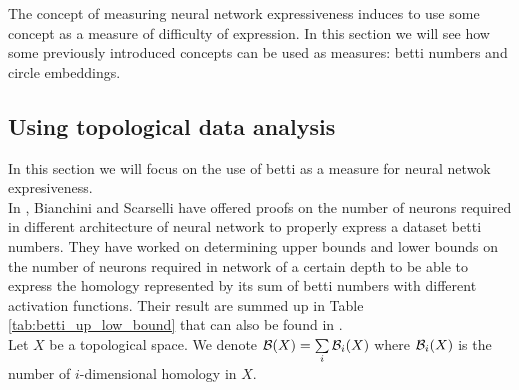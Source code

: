 \documentclass[12pt, a4paper]{article}
\begin{document}
The concept of measuring neural network expressiveness induces to use some concept as a measure of difficulty of expression. In this section we will see how some previously introduced concepts can be used as measures: betti numbers and circle embeddings. 

\subsection{Using topological data analysis}

\label{sec:tda_bib}

In this section we will focus on the use of betti as a measure for neural netwok expresiveness.\\

In \cite{bianchini_complexity_2014}, Bianchini and Scarselli have offered proofs on the number of neurons required in different architecture of neural network to properly express a dataset betti numbers. They have worked on determining upper bounds and lower bounds on the number of neurons required in network of a certain depth to be able to express the homology represented by its sum of betti numbers with different activation functions. Their result are summed up in Table \ref{tab:betti_up_low_bound} that can also be found in \cite{bianchini_complexity_2014}.\\

Let $X$ be a topological space. We denote $\mathcal{B}(X) = \sum\limits_{i} \mathcal{B}_i(X)$ where $\mathcal{B}_i(X)$ is the number of $i$-dimensional homology in $X$.
\end{document}
